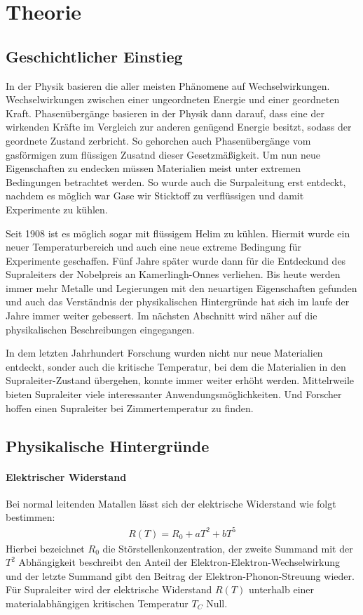 \section{Theorie}
\label{sec:Theorie}
\subsection{Geschichtlicher Einstieg}
In der Physik basieren die aller meisten Ph\"anomene auf Wechselwir{\-}kun{\-}gen.
Wechselwir{\-}kun{\-}gen zwischen einer ungeordneten Energie und einer geordneten Kraft.
Phasen\"uberg\"ange basieren in der Physik dann darauf, dass eine der wirkenden Kr\"afte im Vergleich zur anderen gen\"ugend Energie besitzt, sodass der geordnete Zustand zerbricht.
So gehorchen auch Phasen\"uberg\"ange vom gasf\"ormigen zum fl\"ussigen Zusatnd dieser Gesetzm\"a{\ss}igkeit.
Um nun neue Eigenschaften zu endecken m\"ussen Materialien meist unter extremen Bedingungen betrachtet werden.
So wurde auch die Surpaleitung erst entdeckt, nachdem es m\"oglich war Gase wir Sticktoff zu verfl\"ussigen und damit Experimente zu k\"uhlen.

Seit 1908 ist es m\"oglich sogar mit fl\"ussigem Helim zu k\"uhlen.
Hiermit wurde ein neuer Temperaturbereich und auch eine neue extreme Bedingung f\"ur Experimente geschaffen.
F\"unf Jahre sp\"ater wurde dann f\"ur die Entdeckund des Supraleiters der Nobelpreis an Kamerlingh-Onnes verliehen.
Bis heute werden immer mehr Metalle und Legierungen mit den neuartigen Eigenschaften gefunden und auch das Verst\"andnis der physikalischen Hintergr\"unde hat sich im laufe der Jahre immer weiter gebessert.
Im n\"achsten Abschnitt wird n\"aher auf die physikalischen Beschreibungen eingegangen.

In dem letzten Jahrhundert Forschung wurden nicht nur neue Materialien entdeckt, sonder auch die kritische Temperatur, bei dem die Materialien in den Supraleiter-Zustand \"ubergehen, konnte immer weiter erh\"oht werden.
Mittelrweile bieten Supraleiter viele interessanter Anwendungsmöglichkeiten.
Und Forscher hoffen einen Supraleiter bei Zimmertemperatur zu finden. 

\subsection{Physikalische Hintergr\"unde}
\paragraph{Elektrischer Widerstand}
Bei normal leitenden Matallen l\"{a}sst sich der elektrische Widerstand wie folgt bestimmen:
\begin{align*}
	R(T) = R_0 + aT^2 + bT^5
\end{align*}
Hierbei bezeichnet $R_0$ die St\"{o}rstellenkonzentration, der zweite Summand mit der $T^2$ Abh\"{a}ngigkeit beschreibt den Anteil der Elektron-Elektron-Wechselwirkung und der letzte Summand gibt den Beitrag der Elektron-Phonon-Streuung wieder. \\
F\"{u}r Supraleiter wird der elektrische Widerstand $R(T)$ unterhalb einer materialabh\"{a}ngigen kritischen Temperatur $T_C$ Null.

